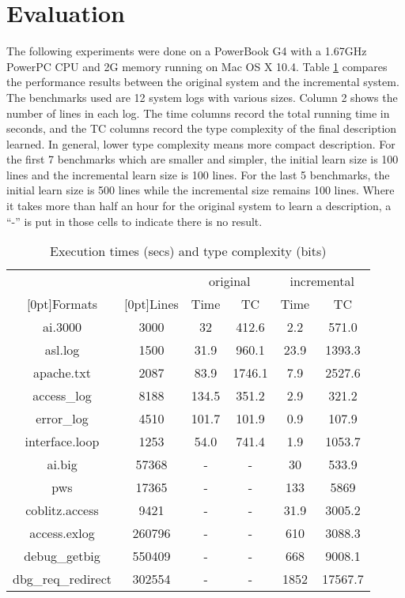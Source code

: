 \section{Evaluation}
\label{sec:eval}
The following experiments were done on a PowerBook G4 with a 1.67GHz PowerPC
CPU and 2G memory running on Mac OS X 10.4. 
Table \ref{tab:results} compares the performance results between
the original \learnpads{} system and the incremental system. 
The benchmarks used are 12 system logs with various sizes. Column 2
shows the number of lines in each log. The time columns record the total
running time in seconds, and the TC columns record the type complexity
of the final description learned. In general, lower type complexity means
more compact description. For the first 7 benchmarks which are smaller
and simpler, the initial learn size is 100 lines and the 
incremental learn size is 100 lines. For the last 5 benchmarks, 
the initial learn size is 500 lines while the incremental size remains
100 lines. Where it takes more than half an hour for the original \learnpads{}
system to learn a description, a ``-'' is put in those cells to 
indicate there is no result.

\begin{table}[th]
\begin{tabular}{|c|c|c|c|c|c|}\hline
& & \multicolumn{2}{|c|}{original} & \multicolumn{2}{|c|}{incremental} \\ \cline{3-6}
\raisebox{1.5ex}[0pt]{Formats} & \raisebox{1.5ex}[0pt]{Lines} &
	Time & TC & Time & TC \\ \hline \hline
ai.3000	&	3000	& 32	& 412.6	& 2.2	& 571.0	\\ \hline
asl.log  &	1500	& 31.9	& 960.1	& 23.9 	& 1393.3 \\ \hline
apache.txt  &	2087	& 83.9 & 1746.1 & 7.9 	& 2527.6 \\ \hline
access\_log  &	8188 	& 134.5	& 351.2	& 2.9	& 321.2	\\ \hline
error\_log  &	4510	& 101.7	& 101.9	& 0.9	& 107.9 \\ \hline
interface.loop & 1253	& 54.0	& 741.4	& 1.9	& 1053.7 \\ \hline
ai.big	&	57368	& -	& -	& 30	& 533.9 \\ \hline
pws	&	 17365	& -	& - 	& 133  & 5869 \\ \hline
coblitz.access & 9421   & -	& -	& 31.9 & 3005.2 \\ \hline
access.exlog & 260796 	& -	& -	& 610 & 3088.3 \\ \hline
debug\_getbig & 550409   & -	& -	& 668 & 9008.1 \\ \hline
dbg\_req\_redirect & 302554 & -	& -	& 1852 & 17567.7 \\ \hline
\end{tabular}
\caption{Execution times (secs) and type complexity (bits)} 
\label{tab:results}
\end{table}


